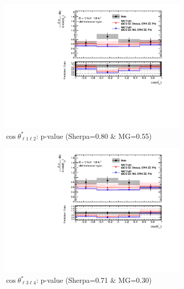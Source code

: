 \begin{figure}[!htbp]
    \centering
    \begin{subfigure}{.49\textwidth}
        \centering
        \includegraphics[width=.98\linewidth]{figures/Results/CrossSection_VBSEnhanced/xs_cosThetaStar1_SR.pdf}
        \caption{ \footnotesize{$\cos \theta^{*}_{\ell 1 \ell 2}$: p-value (Sherpa=0.80 $\&$ MG=0.55)}}
    \end{subfigure}
    \begin{subfigure}{.49\textwidth}
        \centering
        \includegraphics[width=.98\linewidth]{figures/Results/CrossSection_VBSEnhanced/xs_cosThetaStar3_SR.pdf}
        \caption{ \footnotesize{$\cos \theta^{*}_{\ell 3 \ell 4}$: p-value (Sherpa=0.71 $\&$ MG=0.30)} }
    \end{subfigure}\\
    \begin{subfigure}{.49\textwidth}

\end{subfigure}
\end{figure}
